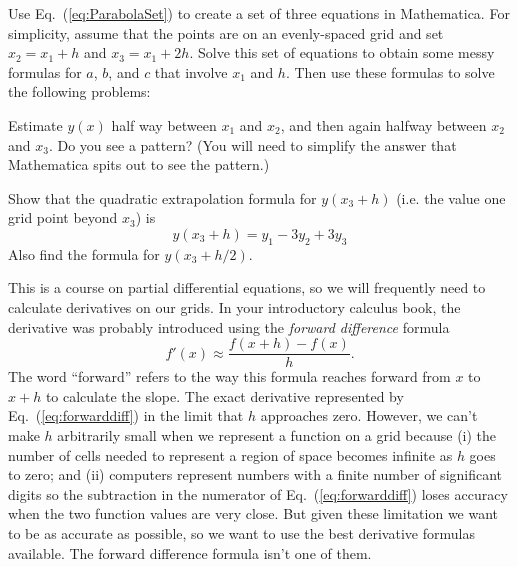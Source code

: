 \begin{enumerate}
\prob \label{P:1.4} Use Eq.~(\ref{eq:ParabolaSet}) to create a
    set of three equations in Mathematica. For simplicity, assume
    that the points are on an evenly-spaced grid and set
    $x_2=x_1+h$ and $x_3=x_1+2h$.  Solve this set of equations to
    obtain some messy formulas for $a$, $b$, and $c$ that involve
    $x_1$ and $h$. Then use these formulas to solve the following
    problems:

\begin{enumerate}

\subprob Estimate $y(x)$ half way between $x_1$ and $x_2$,
    and then again halfway between $x_2$ and $x_3$. Do you
    see a pattern? (You will need to simplify the answer that
    Mathematica spits out to see the pattern.)

\subprob Show that the quadratic extrapolation formula for
    $y(x_3+h)$ (i.e. the value one grid point beyond $x_3$)
    is
    \begin{equation}\label{eq:quadExtrap}
        y(x_3+h) = y_1 - 3 y_2 + 3 y_3
    \end{equation}
    Also find the formula for $y(x_3+h/2)$.
\end{enumerate}
\end{enumerate}



This is a course on partial differential equations, so we will
frequently need to calculate derivatives on our grids. In your
introductory calculus book, the derivative was probably introduced
using the {\it forward difference} formula
\begin{equation}\label{eq:forwarddiff}
     f'(x) \approx \frac{f(x+h)-f(x)}{h} .
\end{equation}
The word ``forward'' refers to the way this formula reaches forward
from $x$ to $x+h$ to calculate the slope. The exact derivative
represented by Eq.~(\ref{eq:forwarddiff}) in the limit that $h$
approaches zero.  However, we can't make $h$ arbitrarily small when
we represent a function on a grid because (i) the number of cells
needed to represent a region of space becomes infinite as $h$ goes to
zero; and (ii) computers represent numbers with a finite number of
significant digits so the subtraction in the numerator of
Eq.~(\ref{eq:forwarddiff}) loses accuracy when the two function
values are very close. But given these limitation we want to be as
accurate as possible, so we want to use the best derivative formulas
available. The forward difference formula isn't one of them.

